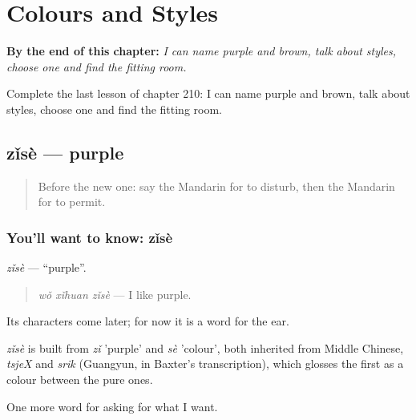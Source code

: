 
\chapter{Colours and Styles}
\label{ch:zh-colours-and-styles}

\begin{chapteropening}
\textbf{By the end of this chapter:} \emph{I can name purple and brown, talk about styles, choose one and find the fitting room.}

Complete the last lesson of chapter 210: I can name purple and brown, talk about styles, choose one and find the fitting room.
\end{chapteropening}

\section[zǐsè]{zǐsè — purple}

\label{lesson:ZH-C210-zise}



\begin{quote}
Before the new one: say the Mandarin for to disturb, then the Mandarin for to permit.
\end{quote}

\subsection*{You'll want to know: zǐsè}
\emph{zǐsè} — \textquotedblleft{}purple\textquotedblright{}.

\begin{quote}
\emph{wǒ xǐhuan zǐsè} — I like purple.
\end{quote}

Its characters come later; for now it is a word for the ear.

\begin{cousinweb}
\emph{zǐsè} is built from \emph{zǐ} 'purple' and \emph{sè} 'colour', both inherited from Middle Chinese, \emph{tsjeX} and \emph{srik} (Guangyun, in Baxter's transcription), which glosses the first as a colour between the pure ones.
\end{cousinweb}

\begin{grammarlens}[title={What you've built}]
One more word for asking for what I want.
\end{grammarlens}

